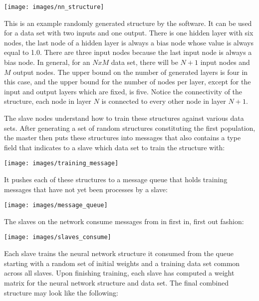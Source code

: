 \texttt{[image: images/nn\_structure]}

This is an example randomly generated structure by the software.
It can be used for a data set with two inputs and one output.
There is one hidden layer with six nodes, the last node of a hidden layer is always a bias node whose value is always equal to 1.0.
There are three input nodes because the last input node is always a bias node.
In general, for an \begin{math}N x M\end{math} data set, there will be \begin{math}N + 1\end{math} input nodes and \begin{math}M\end{math} output nodes.
The upper bound on the number of generated layers is four in this case, and the upper bound for the number of nodes per layer, except for the input and output layers which are fixed, is five.
Notice the connectivity of the structure, each node in layer \begin{math}N\end{math} is connected to every other node in layer \begin{math}N+1\end{math}.  

The slave nodes understand how to train these structures against various data sets.
After generating a set of random structures constituting the first population, the master then puts these structures into messages that also contains a type field that indicates to a slave which data set to train the structure with:

\texttt{[image: images/training\_message]}

It pushes each of these structures to a message queue that holds training messages that have not yet been processes by a slave:

\texttt{[image: images/message\_queue]}

The slaves on the network consume messages from in first in, first out fashion:

\texttt{[image: images/slaves\_consume]}

Each slave trains the neural network structure it consumed from the queue starting with a random set of initial weights and a training data set common across all slaves.
Upon finishing training, each slave has computed a weight matrix for the neural network structure and data set.
The final combined structure may look like the following: 

